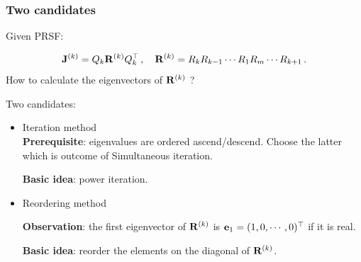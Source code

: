 \documentclass[mathserif, handout]{beamer}
\begin{document}
\begin{frame}
  \frametitle{Two candidates}
  Given PRSF:
  
  \[
  \ps{\jMps}{k}=Q_{k}\ps{R}{k}Q_{k}^\top \,, \quad 
  \ps{R}{k}=R_{k}R_{k-1}\cdots R_{1}R_{m}\cdots R_{k+1}
  \,.
  \]
  How to calculate the eigenvectors of $\ps{R}{k}$ ?
  
  \pause 
  
  Two candidates:
  \begin{itemize}
  \item {\color{green} Iteration method} \\
    \textbf{Prerequisite}: eigenvalues are ordered ascend/descend. Choose 
    the latter which is outcome of Simultaneous iteration.
    
    \textbf{Basic idea}: power iteration.

    \pause
  
  \item {\color{green} Reordering method} 
    
    \textbf{Observation}: the first eigenvector of $\ps{R}{k}$ is 
    $\jEigvec[1]=(1,0,\cdots,0)^\top $ if it is real. 
    
    \textbf{Basic idea}: reorder the elements on the diagonal
    of $\ps{R}{k}$.

  \end{itemize}

  
\end{frame}
\end{document}
